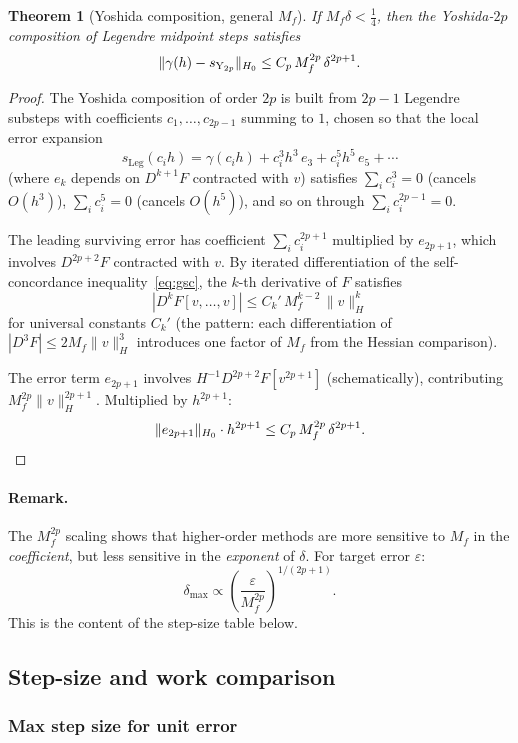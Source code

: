 \documentclass[11pt]{article}
\newtheorem{theorem}{Theorem}
\begin{document}
\begin{theorem}[Yoshida composition, general $M_f$]\label{thm:yoshida-Mf}
If $M_f\delta < \frac{1}{4}$, then the Yoshida-$2p$ composition
of Legendre midpoint steps satisfies
\[
  \|\gamma(h) - s_{\textup{Y}_{2p}}\|_{H_0}
  \leq C_p\, M_f^{2p}\, \delta^{2p+1}.
\]
\end{theorem}
\begin{proof}
The Yoshida composition of order $2p$ is built from $2p-1$ Legendre
substeps with coefficients $c_1, \ldots, c_{2p-1}$ summing to $1$,
chosen so that the local error expansion
\[
  s_{\text{Leg}}(c_i h)
  = \gamma(c_i h) + c_i^3 h^3\, e_3 + c_i^5 h^5\, e_5 + \cdots
\]
(where $e_k$ depends on $D^{k+1}F$ contracted with $v$)
satisfies $\sum_i c_i^3 = 0$ (cancels $O(h^3)$),
$\sum_i c_i^5 = 0$ (cancels $O(h^5)$), and so on through
$\sum_i c_i^{2p-1} = 0$.

The leading surviving error has coefficient $\sum_i c_i^{2p+1}$
multiplied by $e_{2p+1}$, which involves $D^{2p+2}F$ contracted
with $v$.  By iterated differentiation of the self-concordance
inequality~\eqref{eq:gsc}, the $k$-th derivative of $F$ satisfies
\[
  |D^k F[v, \ldots, v]| \leq C_k'\, M_f^{k-2}\, \|v\|_H^k
\]
for universal constants $C_k'$ (the pattern: each differentiation
of $|D^3F| \leq 2M_f\|v\|_H^3$ introduces one factor of $M_f$
from the Hessian comparison).

The error term $e_{2p+1}$ involves $H^{-1} D^{2p+2}F[v^{2p+1}]$
(schematically), contributing $M_f^{2p}\|v\|_H^{2p+1}$.
Multiplied by $h^{2p+1}$:
\[
  \|e_{2p+1}\|_{H_0} \cdot h^{2p+1}
  \leq C_p\, M_f^{2p}\, \delta^{2p+1}. \qedhere
\]
\end{proof}

\paragraph{Remark.}
The $M_f^{2p}$ scaling shows that higher-order methods are more
sensitive to $M_f$ in the \emph{coefficient}, but less sensitive
in the \emph{exponent} of $\delta$.  For target error $\varepsilon$:
\[
  \delta_{\max} \propto \left(\frac{\varepsilon}{M_f^{2p}}\right)^{1/(2p+1)}.
\]
This is the content of the step-size table below.

\subsection{Step-size and work comparison}

\subsubsection{Max step size for unit error}
\end{document}
